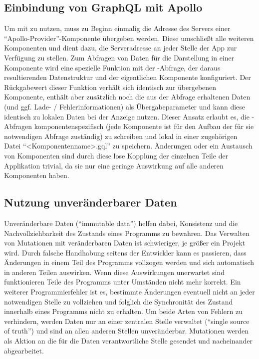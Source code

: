 \subsection{Einbindung von GraphQL mit Apollo}
Um  mit  zu nutzen, muss zu Beginn einmalig die Adresse des Servers einer \enquote{Apollo-Provider}-Komponente übergeben werden. Diese umschließt alle weiteren Komponenten und dient dazu, die Serveradresse an jeder Stelle der App zur Verfügung zu stellen. Zum Abfragen von Daten für die Darstellung in einer Komponente wird eine spezielle Funktion mit der -Abfrage, der daraus resultierenden Datenstruktur und der eigentlichen Komponente konfiguriert. Der Rückgabewert dieser Funktion verhält sich identisch zur übergebenen Komponente, enthält aber zusätzlich noch die aus der Abfrage erhaltenen Daten (und ggf. Lade- / Fehlerinformationen) als Übergabeparameter und kann diese identisch zu lokalen Daten bei der Anzeige nutzen.
Dieser Ansatz erlaubt es, die -Abfragen komponentenspezifisch (jede Komponente ist für den Aufbau der für sie notwendigen Abfrage zuständig) zu schreiben und lokal in einer zugehörigen Datei \enquote{<Komponentenname>.gql} zu speichern. Änderungen oder ein Austausch von Komponenten sind durch diese lose Kopplung der einzelnen Teile der Applikation trivial, da sie nur eine geringe Auswirkung auf alle anderen Komponenten haben.

\subsection{Nutzung unveränderbarer Daten}
Unveränderbare Daten (\enquote{immutable data}) helfen dabei, Konsistenz und die Nachvollziehbarkeit des Zustands eines Programms zu bewahren. Das Verwalten von Mutationen mit veränderbaren Daten ist schwieriger, je größer ein Projekt wird. Durch falsche Handhabung seitens der Entwickler kann es passieren, dass Änderungen in einem Teil des Programms vollzogen werden und sich automatisch in anderen Teilen auswirken. Wenn diese Auswirkungen unerwartet sind funktionieren Teile des Programms unter Umständen nicht mehr korrekt. Ein weiterer Programmierfehler ist es, bestimmte Änderungen eventuell nicht an jeder notwendigen Stelle zu vollziehen und folglich die Synchronität des Zustand innerhalb eines Programms nicht zu erhalten. Um beide Arten von Fehlern zu verhindern, werden Daten nur an einer zentralen Stelle verwaltet (\enquote{single source of truth}) und sind an allen anderen Stellen unveränderbar. Mutationen werden als Aktion an die für die Daten verantwortliche Stelle gesendet und nacheinander abgearbeitet.

